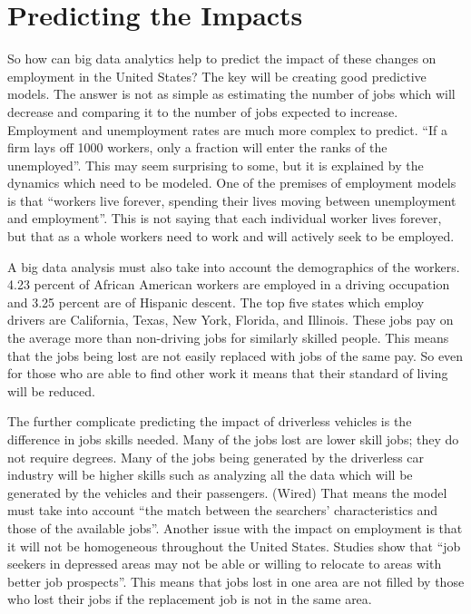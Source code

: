 \documentclass[sigconf]{acmart}
\begin{document}
\section{Predicting the Impacts}

So how can big data analytics help to predict the impact of these changes on 
employment in the United States?  The key will be creating good predictive 
models.  The answer is not as simple as estimating the number of jobs which 
will decrease and comparing it to the number of jobs expected to increase.  
Employment and unemployment rates are much more complex to predict.  ``If a 
firm lays off 1000 workers, only a fraction will enter the ranks of the 
unemployed''\cite{MacroTheory}.  This may seem surprising to some, but it is 
explained by the dynamics which need to be modeled.  One of the premises 
of employment models is that ``workers live forever, spending their lives 
moving between unemployment and employment''\cite{QuantitativeEconomics}.  This 
is not saying that each individual worker lives forever, but that as a whole 
workers need to work and will actively seek to be employed.  

A big data analysis must also take into account the demographics of the 
workers.  4.23 percent of African American workers are employed in a driving 
occupation and 3.25 percent are of Hispanic descent.  The top five states 
which employ drivers are California, Texas, New York, Florida, and Illinois.  
These jobs pay on the average more than non-driving jobs for similarly 
skilled people\cite{InsuranceJournal}.  This means that the jobs being lost are 
not easily replaced with jobs of the same pay.  So even for those who are 
able to find other work it means that their standard of living will be 
reduced.  

The further complicate predicting the impact of driverless vehicles is the 
difference in jobs skills needed.  Many of the jobs lost are lower skill jobs; 
they do not require degrees.  Many of the jobs being generated by the 
driverless car industry will be higher skills such as analyzing all the data 
which will be generated by the vehicles and their passengers.  (Wired)  That 
means the model must take into account ``the match between the searchers' 
characteristics and those of the available jobs''\cite{MacroTheory}.  Another 
issue with the impact on employment is that it will not be homogeneous 
throughout the United States.  Studies show that ``job seekers in depressed 
areas may not be able or willing to relocate to areas with better job 
prospects''\cite{NBERw22672}.  This means that jobs lost in one area are not 
filled by those who lost their jobs if the replacement job is not in the 
same area.  
\end{document}
